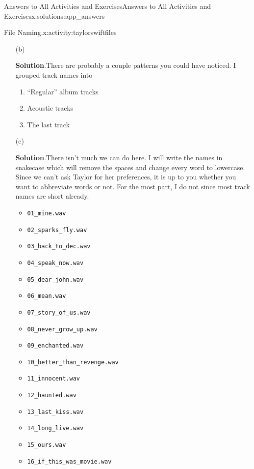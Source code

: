 \documentclass[oneside,10pt,]{book}
\newcommand{\blocktitlefont}{\relax}
\newcommand{\mono}[1]{\texttt{#1}}
\begin{document}
\begin{solutions-chapter}{Answers to All Activities and Exercises}{}{Answers to All Activities and Exercises}{}{}{x:solutions:app_answers}
\begin{activitysolution}{1.2}{File Naming.}{x:activity:taylorswiftfiles}
\begin{enumerate}[font=\bfseries,label=(\alph*),ref=\alph*]
\par
The two here are the main issues; you may have thought of others. Great! I'm sure they are good observations.%
\item[(b)]\par\smallskip%
\noindent\textbf{\blocktitlefont Solution}.\hypertarget{g:solution:idp615169064-back}{}\quad{}There are probably a couple patterns you could have noticed. I grouped track names into%
\begin{enumerate}[label=\arabic*]
\item{}``Regular'' album tracks%
\item{}Acoustic tracks%
\item{}The last track%
\end{enumerate}
%
\item[(c)]\par\smallskip%
\noindent\textbf{\blocktitlefont Solution}.\hypertarget{g:solution:idp615183784-back}{}\quad{}There isn't much we can do here. I will write the names in snake\textunderscore{}case which will remove the spaces and change every word to lowercase. Since we can't ask Taylor for her preferences, it is up to you whether you want to abbreviate words or not. For the most part, I do not since most track names are short already.%
\begin{multicols}{2}
\begin{itemize}[label=\textbullet]
\item{}\mono{01\_mine.wav}%
\item{}\mono{02\_sparks\_fly.wav}%
\item{}\mono{03\_back\_to\_dec.wav}%
\item{}\mono{04\_speak\_now.wav}%
\item{}\mono{05\_dear\_john.wav}%
\item{}\mono{06\_mean.wav}%
\item{}\mono{07\_story\_of\_us.wav}%
\item{}\mono{08\_never\_grow\_up.wav}%
\item{}\mono{09\_enchanted.wav}%
\item{}\mono{10\_better\_than\_revenge.wav}%
\item{}\mono{11\_innocent.wav}%
\item{}\mono{12\_haunted.wav}%
\item{}\mono{13\_last\_kiss.wav}%
\item{}\mono{14\_long\_live.wav}%
\item{}\mono{15\_ours.wav}%
\item{}\mono{16\_if\_this\_was\_movie.wav}%

\end{itemize}
\end{multicols}
\end{enumerate}
\end{activitysolution}
\end{solutions-chapter}
\end{document}

